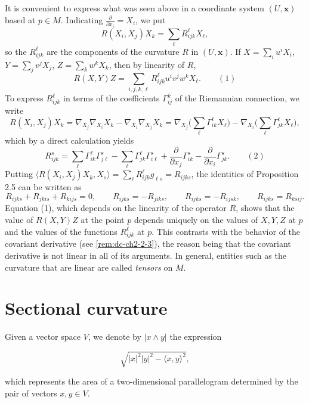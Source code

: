\begin{remark}[Remark 2.6]
  \label{rem:dc-ch4-2-6}


  It is convenient to express what was seen above in a coordinate system $(U,\mathbf{x})$
  based at $p\in M$. Indicating $\frac{\partial}{\partial x_i}=X_i$, we put
  $$
  R(X_i,X_j)X_k=\sum_\ell R_{ijk}^\ell X_\ell,
  $$
  so the $R_{ijk}^\ell$ are the components of the curvature $R$ in $(U,\mathbf{x})$.
  If $X=\sum_i u^i X_i$, $Y=\sum_j v^j X_j$, $Z=\sum_k w^k X_k$, then by linearity of
  $R$,
  $$
  R(X,Y)Z=\sum_{i,j,k,\ell}R_{ijk}^\ell u^i v^j w^k X_\ell.\qquad(1)
  $$
  To express $R_{ijk}^\ell$ in terms of the coefficients $\Gamma_{ij}^k$ of the
  Riemannian connection, we write
  $$
  R(X_i,X_j)X_k=\nabla_{X_j}\nabla_{X_i}X_k-\nabla_{X_i}\nabla_{X_j}X_k=\nabla_{X_j}\Big(\sum_\ell\Gamma_{ik}^\ell X_\ell\Big)-\nabla_{X_i}\Big(\sum_\ell\Gamma_{jk}^\ell X_\ell\Big),
  $$
  which by a direct calculation yields
  $$
  R_{ijk}^s=\sum_\ell\Gamma_{ik}^\ell\Gamma_{j\ell}^s-\sum_\ell\Gamma_{jk}^\ell\Gamma_{i\ell}^s+\frac{\partial}{\partial x_j}\Gamma_{ik}^s-\frac{\partial}{\partial x_i}\Gamma_{jk}^s.\qquad(2)
  $$
  Putting $\langle R(X_i,X_j)X_k,X_s\rangle=\sum_\ell R_{ijk}^\ell g_{\ell s}=R_{ijks}$,
  the identities of Proposition 2.5 can be written as
  $$
  R_{ijks}+R_{jkis}+R_{kijs}=0,\qquad R_{ijks}=-R_{jiks},\qquad R_{ijks}=-R_{ijsk},\qquad R_{ijks}=R_{ksij}.
  $$
  Equation (1), which depends on the linearity of the operator $R$, shows that the
  value of $R(X,Y)Z$ at the point $p$ depends uniquely on the values of $X,Y,Z$ at
  $p$ and the values of the functions $R_{ijk}^\ell$ at $p$. This contrasts with the
  behavior of the covariant derivative (see \cref{rem:dc-ch2-2-3}), the reason
  being that the covariant derivative is not linear in all of its arguments. In
  general, entities such as the curvature that are linear are called \emph{tensors} on
  $M$.
\end{remark}

\section{Sectional curvature}

Given a vector space $V$, we denote by $|x\wedge y|$ the expression

$$
\sqrt{|x|^2|y|^2-\langle x,y\rangle^2},
$$

which represents the area of a two-dimensional parallelogram determined by the
pair of vectors $x,y\in V$.

